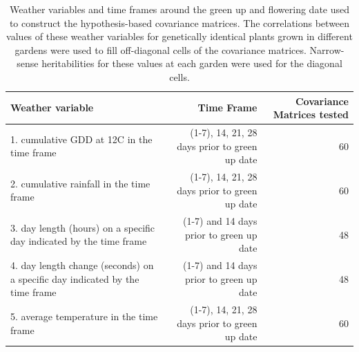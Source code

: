 \documentclass[
  9pt,
  twocolumn,
  twoside]{pnas-new}
\begin{document}
\begin{table}[t!]
\centering
\caption{Weather variables and time frames around the green up and flowering date used to construct the hypothesis-based covariance matrices. The correlations between values of these weather variables for genetically identical plants grown in different gardens were used to fill off-diagonal cells of the covariance matrices. Narrow-sense heritabilities for these values at each garden were used for the diagonal cells.}
\begin{tabular}{lrr}
Weather variable & Time Frame & Covariance Matrices tested \\
\midrule
1. cumulative GDD at 12C in the time frame & (1-7), 14, 21, 28 days prior to green up date & 60 \\
2. cumulative rainfall in the time frame & (1-7), 14, 21, 28 days prior to green up date & 60  \\
3. day length (hours) on a specific day indicated by the time frame & (1-7) and 14 days prior to green up date & 48 \\
4. day length change (seconds) on a specific day indicated by the time frame & (1-7) and 14 days prior to green up date & 48 \\
5. average temperature in the time frame & (1-7), 14, 21, 28 days prior to green up date & 60 \\
\bottomrule
\end{tabular}

\end{table}
\end{document}
